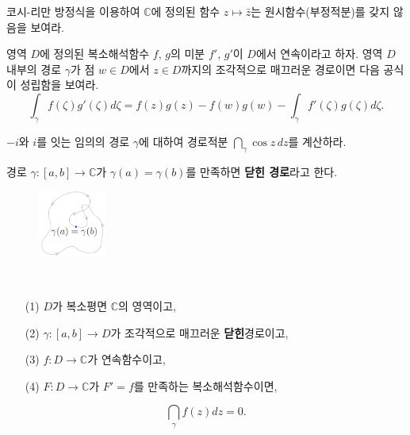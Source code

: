 \begin{salt_exercise} \label{ex-3-11}
코시-리만 방정식을 이용하여
$\mathbb C$에 정의된 함수 $z \mapsto \bar z$는 원시함수(부정적분)를 
갖지 않음을 보여라.
\end{salt_exercise}

\begin{salt_exercise}[부분적분 공식] \label{ex-3-12}
영역 $D$에 정의된 복소해석함수 $f$, $g$의 미분
$f'$, $g'$이 $D$에서 연속이라고 하자.
영역 $D$ 내부의 경로 $\gamma$가 
점 $w\in D$에서 $z\in D$까지의  조각적으로 매끄러운 경로이면
다음 공식이 성립함을 보여라.
\[
\int_\gamma f(\zeta)g'(\zeta)d\zeta 
= f(z)g(z) - f(w)g(w) - \int_\gamma f'(\zeta)g(\zeta)d\zeta.
\]
\end{salt_exercise}

\begin{salt_exercise} \label{ex-3-13}
$-i$와 $i$를 잇는 임의의 경로 $\gamma$에 대하여
경로적분 $\dint_\gamma \cos z\, dz$를 계산하라.
\end{salt_exercise}

\begin{saltdefinition}{}{} \label{def-3-2}
경로 $\gamma:[a,b] \to \mathbb C$가
$\gamma(a)= \gamma(b)$를 만족하면 {\bf 닫힌 경로}라고 한다.
\end{saltdefinition}

\begin{figure}[!h]
\begin{center}
\includegraphics[width=0.2\textwidth]{./SaltChapter/figs/fig-3-0-1}
\end{center}
\end{figure}

\begin{salt_corollary} \label{coro-3-1}
\
\begin{itemize}
\item[(1)] $D$가 복소평면 $\mathbb C$의 영역이고,
\item[(2)] $\gamma : [a,b] \to D$가 조각적으로 매끄러운 {\bf 닫힌}경로이고,
\item[(3)] $f:D\to\mathbb C$가  연속함수이고,
\item[(4)] $F:D\to \mathbb C$가  $F'=f$를 만족하는 복소해석함수이면,
\end{itemize}
\[
\dint_\gamma f(z)dz = 0.
\]
\end{salt_corollary}

